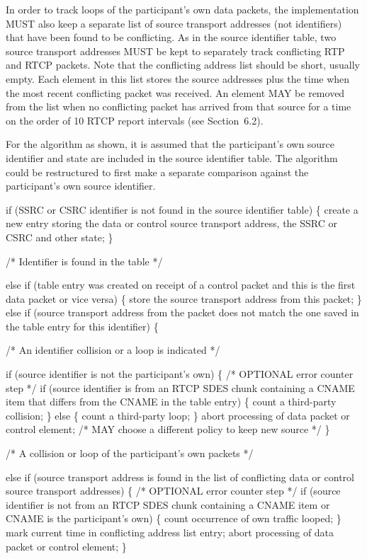 \documentclass{article}
\begin{document}
\begin{itemize}
In order to track loops of the participant's own data packets, the implementation MUST also keep a separate list of source transport addresses (not identifiers) that have been found to be conflicting. As in the source identifier table, two source transport addresses MUST be kept to separately track conflicting RTP and RTCP packets. Note that the conflicting address list should be short, usually empty.  Each element in this list stores the source addresses plus the time when the most recent conflicting packet was received.  An element MAY be removed from the list when no conflicting packet has arrived from that source for a time on the order of 10 RTCP report intervals (see Section~6.2).

For the algorithm as shown, it is assumed that the participant's own source identifier and state are included in the source identifier table.  The algorithm could be restructured to first make a separate comparison against the participant's own source identifier.

if (SSRC or CSRC identifier is not found in the source identifier table) \{ create a new entry storing the data or control source transport address, the SSRC or CSRC and other state; \}

/* Identifier is found in the table */

else if (table entry was created on receipt of a control packet and this is the first data packet or vice versa) \{ store the source transport address from this packet; \} else if (source transport address from the packet does not match the one saved in the table entry for this identifier) \{

/* An identifier collision or a loop is indicated */

if (source identifier is not the participant's own) \{ /* OPTIONAL error counter step */ if (source identifier is from an RTCP SDES chunk containing a CNAME item that differs from the CNAME in the table entry) \{ count a third-party collision; \} else \{ count a third-party loop; \} abort processing of data packet or control element; /* MAY choose a different policy to keep new source */ \}

/* A collision or loop of the participant's own packets */

else if (source transport address is found in the list of conflicting data or control source transport addresses) \{ /* OPTIONAL error counter step */ if (source identifier is not from an RTCP SDES chunk containing a CNAME item or CNAME is the participant's own) \{ count occurrence of own traffic looped; \} mark current time in conflicting address list entry; abort processing of data packet or control element; \}


\end{itemize}
\end{document}
